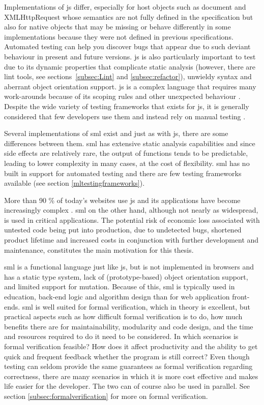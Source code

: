 \documentclass[11pt]{article}
\begin{document}
Implementations of \gls{js} differ, especially for host objects such as document and XMLHttpRequest whose semantics are not fully defined in the specification but also for native objects that may be missing or behave differently in some implementations because they were not defined in previous specifications. Automated testing can help you discover bugs that appear due to such deviant behaviour in present and future versions. \gls{js} is also particularly important to test due to its dynamic properties \cite{AutomatedTesting} that complicate static analysis (however, there are lint tools, see sections~\ref{subsec:Lint} and \ref{subsec:refactor}), unwieldy syntax and aberrant object orientation support. \gls{js} is a complex language that requires many work-arounds because of its scoping rules and other unexpected behaviour \cite[appendix A]{GoodParts}. Despite the wide variety of testing frameworks that exists for \gls{js}, it is generally considered that few developers use them and instead rely on manual testing \cite{AutomatedTesting}.

Several implementations of \gls{sml} exist and just as with \gls{js}, there are some differences between them. \gls{sml} has extensive static analysis capabilities and since side effects are relatively rare, the output of functions tends to be predictable, leading to lower complexity in many cases, at the cost of flexibility. \gls{sml} has no built in support for automated testing and there are few testing frameworks available (see section \ref{mltestingframeworks}).

More than 90 \% of today's websites use \gls{js} \cite{BusinessJavascript} and its applications have become increasingly complex \cite[question~23]{Ekelof}. \gls{sml} on the other hand, although not nearly as widespread, is used in critical applications. The potential risk of economic loss associated with untested code being put into production, due to undetected bugs, shortened product lifetime and increased costs in conjunction with further development and maintenance, constitutes the main motivation for this thesis.

\Gls{sml} is a functional language just like \gls{js}, but is not implemented in browsers and has a static type system, lack of (prototype-based) object orientation support, and limited support for mutation. Because of this, \gls{sml} is typically used in education, back-end logic and algorithm design than for web application front-ends. \Gls{sml} is well suited for formal verification, which in theory is excellent, but practical aspects such as how difficult formal verification is to do, how much benefits there are for maintainability, modularity and code design, and the time and resources required to do it need to be considered. In which scenarios is formal verification feasible? How does it affect productivity and the ability to get quick and frequent feedback whether the program is still correct? Even though testing can seldom provide the same guarantees as formal verification regarding correctness, there are many scenarios in which it is more cost effective and makes life easier for the developer. The two can of course also be used in parallel. See section \ref{subsec:formalverification} for more on formal verification.
\end{document}
